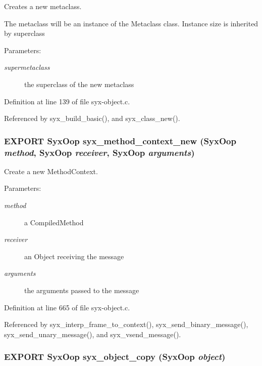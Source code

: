 Creates a new metaclass.

The metaclass will be an instance of the Metaclass class. Instance size is inherited by superclass

\begin{Desc}
\item[Parameters:]
\begin{description}
\item[{\em supermetaclass}]the superclass of the new metaclass \end{description}
\end{Desc}


Definition at line 139 of file syx-object.c.

Referenced by syx\_\-build\_\-basic(), and syx\_\-class\_\-new().\hypertarget{syx-object_8h_ff5c03485bac91b5a79c29a2a6b98dd7}{
\subsubsection{\setlength{\rightskip}{0pt plus 5cm}EXPORT {\bf SyxOop} syx\_\-method\_\-context\_\-new ({\bf SyxOop} {\em method}, \/  {\bf SyxOop} {\em receiver}, \/  {\bf SyxOop} {\em arguments})}}
\label{syx-object_8h_ff5c03485bac91b5a79c29a2a6b98dd7}


Create a new MethodContext.

\begin{Desc}
\item[Parameters:]
\begin{description}
\item[{\em method}]a CompiledMethod \item[{\em receiver}]an Object receiving the message \item[{\em arguments}]the arguments passed to the message \end{description}
\end{Desc}


Definition at line 665 of file syx-object.c.

Referenced by syx\_\-interp\_\-frame\_\-to\_\-context(), syx\_\-send\_\-binary\_\-message(), syx\_\-send\_\-unary\_\-message(), and syx\_\-vsend\_\-message().\hypertarget{syx-object_8h_4495a25fcf21daa1fff65760198a6f0c}{
\subsubsection{\setlength{\rightskip}{0pt plus 5cm}EXPORT {\bf SyxOop} syx\_\-object\_\-copy ({\bf SyxOop} {\em object})}}
\label{syx-object_8h_4495a25fcf21daa1fff65760198a6f0c}


